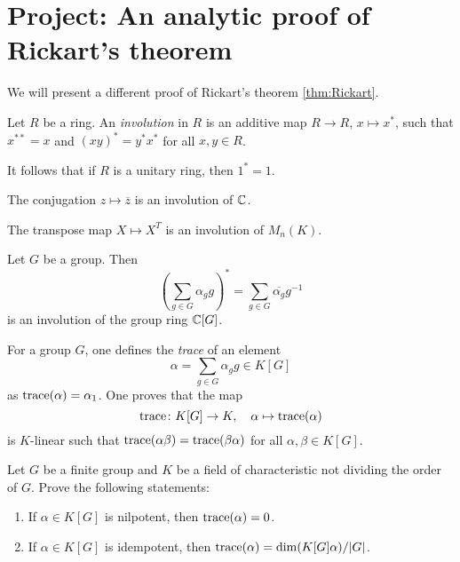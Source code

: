 \section{Project: An analytic proof of Rickart's theorem}
\label{section:Rickart} 

We will present a different proof 
of Rickart's theorem \ref{thm:Rickart}. 

\begin{definition}
	Let $R$ be a ring. An \emph{involution} 
    in $R$ is an additive map  
    $R\to R$, $x\mapsto x^*$, such that $x^{**}=x$ and  $(xy)^*=y^*x^*$ for all 
	$x,y\in R$.
\end{definition}

It follows that if $R$ is a unitary ring, then 
$1^*=1$.

\begin{example}
	The conjugation $z\mapsto\overline{z}$ is an 
    involution of $\mathbb{C}$.
\end{example}

\begin{example}
	The transpose map $X\mapsto X^T$ is an involution of $M_n(K)$.
\end{example}

\begin{example}
	Let $G$ be a group. 
    Then \[
    \left(\sum_{g\in G}\alpha_gg\right)^*=\sum_{g\in G}\overline{\alpha_g}g^{-1}
    \]
	is an involution of the group ring $\mathbb{C}[G]$.
\end{example}

For a group $G$, one defines the \emph{trace} 
of an element 
\[
\alpha=\sum_{g\in G}\alpha_gg\in K[G]
\]
as $\operatorname{trace}(\alpha)=\alpha_1$. One proves that 
the map 
\[
\operatorname{trace}\colon K[G]\to K,\quad 
\alpha\mapsto\operatorname{trace}(\alpha)
\]
is $K$-linear such that   
$\operatorname{trace}(\alpha\beta)=\operatorname{trace}(\beta\alpha)$ for 
all $\alpha,\beta\in K[G]$. 

\begin{exercise}
	Let $G$ be a finite group and $K$ 
 be a field of characteristic not dividing the 
 order of $G$.
	Prove the following statements: 
	\begin{enumerate}
		\item If $\alpha\in K[G]$ is nilpotent, then $\operatorname{trace}(\alpha)=0$.
		\item If $\alpha\in K[G]$ is idempotent, then $\operatorname{trace}(\alpha)=\dim
			(K[G]\alpha)/|G|$.
	\end{enumerate}
\end{exercise}

